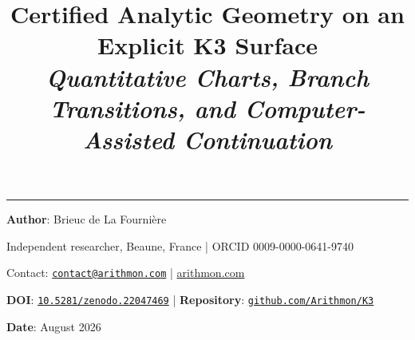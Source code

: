 \documentclass[11pt,a4paper]{article}
\title{%
\LARGE\textbf{Certified Analytic Geometry on an Explicit K3 Surface}\\[0.5em]
\large\itshape Quantitative Charts, Branch Transitions, and Computer-Assisted Continuation%
}
\author{}
\date{}
\begin{document}
\maketitle
\noindent\rule{\textwidth}{0.2pt}

\noindent\textbf{Author}: Brieuc de La Fourni\`ere

\noindent Independent researcher, Beaune, France \quad | \quad ORCID 0009-0000-0641-9740

\noindent Contact: \href{mailto:contact@arithmon.com}{\texttt{contact@arithmon.com}} \quad | \quad \href{https://arithmon.com}{arithmon.com}

\noindent\textbf{DOI}: \href{https://doi.org/10.5281/zenodo.22047469}{\texttt{10.5281/zenodo.22047469}} \quad | \quad \textbf{Repository}: \href{https://github.com/Arithmon/K3}{\texttt{github.com/Arithmon/K3}}

\noindent\textbf{Date}: August 2026


\end{document}
